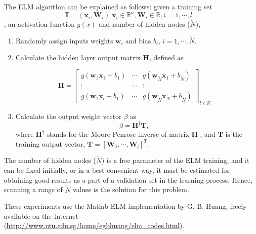 The ELM algorithm can be explained as follows: given a training set $$\mathbb{T} = {(\mathbf{x}_i,\boldsymbol{W}_i) | \mathbf{x}_i \in \mathbb{R}^n, \boldsymbol{W}_i \in \mathbb{R}, i=1, \cdots, l}$$, an activation function $g(x)$ and number of hidden nodes ($\tilde{N}$),

\begin{enumerate}
        \item Randomly assign inputs weights $\mathbf{w}_i$ and bias $b_i$, $i = 1, \cdots ,\tilde{N}$.
        \item Calculate the hidden layer output matrix $\mathbf{H}$, defined as

        \begin{equation}
        \mathbf{H} = \left [ \begin{array}{ccc}
        g( \mathbf{w}_1 \mathbf{x}_1 + b_1) & \cdots & g(\mathbf{w}_{\tilde{N}} \mathbf{x}_1 + b_{\tilde{N}}) \\
        \vdots & \cdots & \vdots \\
        g(\mathbf{w}_1 \mathbf{x}_l + b_1) & \cdots & g(\mathbf{w}_{\tilde{N}} \mathbf{x}_N + b_{\tilde{N}})
        \end{array}
        \right ]_{l \times \tilde{N}}
        \end{equation}


        \item Calculate the output weight vector $\beta$ as
        \begin{equation}
        \beta = \mathbf{H}^\dagger \mathbf{T},
        \end{equation}
        where $\mathbf{H}^\dagger$ stands for the Moore-Penrose inverse of matrix $\mathbf{H}$ \citep{huang2006extreme}, and $\mathbf{T}$ is the training output vector, $\mathbf{T}=[\boldsymbol{W}_1,\cdots,\boldsymbol{W}_l]^T$.
\end{enumerate}

The number of hidden nodes ($\tilde{N}$) is a free parameter of the ELM training, and it can be fixed initially, or in a best convenient way, it must be estimated for obtaining good results as a part of a validation set in the learning process. Hence, scanning a range of $\tilde{N}$ values is the solution for this problem.

These experiments use the Matlab ELM implementation by G. B. Huang, freely available on the Internet (\url{http://www.ntu.edu.sg/home/egbhuang/elm\_codes.html}).

